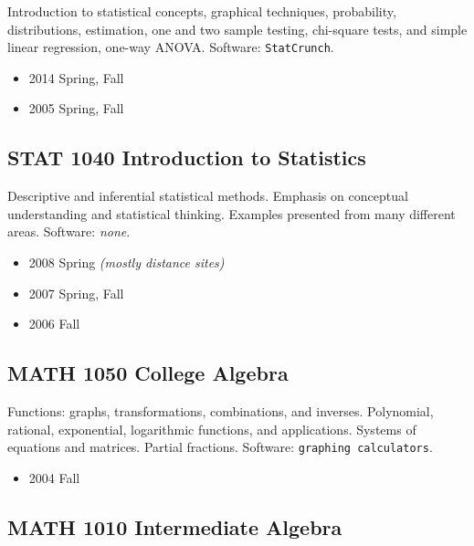\documentclass[11pt,a4paper,]{moderncv}
\providecommand{\tightlist}{%
	\setlength{\itemsep}{0pt}\setlength{\parskip}{0pt}}
\begin{document}
Introduction to statistical concepts, graphical techniques, probability,
distributions, estimation, one and two sample testing, chi-square tests,
and simple linear regression, one-way ANOVA. Software:
\texttt{StatCrunch}.

\begin{itemize}
\tightlist
\item
  2014 Spring, Fall
\item
  2005 Spring, Fall
\end{itemize}

\hypertarget{stat-1040-introduction-to-statistics}{%
\subsection{STAT 1040 Introduction to
Statistics}\label{stat-1040-introduction-to-statistics}}

Descriptive and inferential statistical methods. Emphasis on conceptual
understanding and statistical thinking. Examples presented from many
different areas. Software: \emph{none}.

\begin{itemize}
\tightlist
\item
  2008 Spring \emph{(mostly distance sites)}
\item
  2007 Spring, Fall
\item
  2006 Fall
\end{itemize}

\hypertarget{math-1050-college-algebra}{%
\subsection{MATH 1050 College Algebra}\label{math-1050-college-algebra}}

Functions: graphs, transformations, combinations, and inverses.
Polynomial, rational, exponential, logarithmic functions, and
applications. Systems of equations and matrices. Partial fractions.
Software: \texttt{graphing\ calculators}.

\begin{itemize}
\tightlist
\item
  2004 Fall
\end{itemize}

\hypertarget{math-1010-intermediate-algebra}{%
\subsection{MATH 1010 Intermediate
Algebra}\label{math-1010-intermediate-algebra}}
\end{document}
